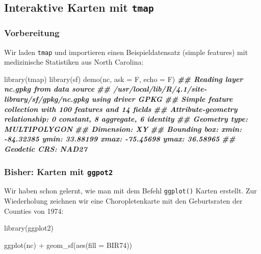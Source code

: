\documentclass[
  ngerman,
]{article}
\newenvironment{Shaded}{\begin{snugshade}}{\end{snugshade}}
\newcommand{\AttributeTok}[1]{\textcolor[rgb]{0.77,0.63,0.00}{#1}}
\newcommand{\DocumentationTok}[1]{\textcolor[rgb]{0.56,0.35,0.01}{\textbf{\textit{#1}}}}
\newcommand{\FunctionTok}[1]{\textcolor[rgb]{0.00,0.00,0.00}{#1}}
\newcommand{\NormalTok}[1]{#1}
\newcommand{\SpecialCharTok}[1]{\textcolor[rgb]{0.00,0.00,0.00}{#1}}
\begin{document}
\hypertarget{interaktive-karten-mit-tmap}{%
\subsection{\texorpdfstring{Interaktive Karten mit \texttt{tmap}}{Interaktive Karten mit tmap}}\label{interaktive-karten-mit-tmap}}

\hypertarget{vorbereitung-8}{%
\subsubsection{Vorbereitung}\label{vorbereitung-8}}

Wir laden \texttt{tmap} und importieren einen Beispieldatensatz (simple features) mit medizinische Statistiken aus North Carolina:

\begin{Shaded}
\begin{Highlighting}[]
\FunctionTok{library}\NormalTok{(tmap)}
\FunctionTok{library}\NormalTok{(sf)}
\FunctionTok{demo}\NormalTok{(nc, }\AttributeTok{ask =}\NormalTok{ F, }\AttributeTok{echo =}\NormalTok{ F)}
\DocumentationTok{\#\# Reading layer \textasciigrave{}nc.gpkg\textquotesingle{} from data source }
\DocumentationTok{\#\#   \textasciigrave{}/usr/local/lib/R/4.1/site{-}library/sf/gpkg/nc.gpkg\textquotesingle{} using driver \textasciigrave{}GPKG\textquotesingle{}}
\DocumentationTok{\#\# Simple feature collection with 100 features and 14 fields}
\DocumentationTok{\#\# Attribute{-}geometry relationship: 0 constant, 8 aggregate, 6 identity}
\DocumentationTok{\#\# Geometry type: MULTIPOLYGON}
\DocumentationTok{\#\# Dimension:     XY}
\DocumentationTok{\#\# Bounding box:  xmin: {-}84.32385 ymin: 33.88199 xmax: {-}75.45698 ymax: 36.58965}
\DocumentationTok{\#\# Geodetic CRS:  NAD27}
\end{Highlighting}
\end{Shaded}

\hypertarget{bisher-karten-mit-ggpot2}{%
\subsubsection{\texorpdfstring{Bisher: Karten mit \texttt{ggpot2}}{Bisher: Karten mit ggpot2}}\label{bisher-karten-mit-ggpot2}}

Wir haben schon gelernt, wie man mit dem Befehl \texttt{ggplot()} Karten erstellt.
Zur Wiederholung zeichnen wir eine Choropletenkarte mit den Geburtsraten der Counties von 1974:

\begin{Shaded}
\begin{Highlighting}[]
\FunctionTok{library}\NormalTok{(ggplot2)}

\FunctionTok{ggplot}\NormalTok{(nc) }\SpecialCharTok{+}
  \FunctionTok{geom\_sf}\NormalTok{(}\FunctionTok{aes}\NormalTok{(}\AttributeTok{fill =}\NormalTok{ BIR74))}
\end{Highlighting}
\end{Shaded}
\end{document}
